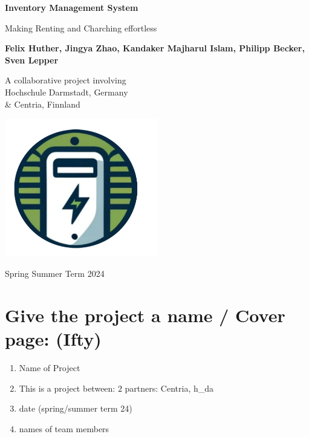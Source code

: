 \begin{titlepage}
    \begin{center}
        \vspace*{1cm}
            
        \Huge
        \textbf{Inventory Management System}
            
        \vspace{0.5cm}
        \LARGE
        Making Renting and Charching effortless
            
        \vspace{1.5cm}
            
        \textbf{
        Felix Huther,
        Jingya Zhao,
        Kandaker Majharul Islam,
        Philipp Becker,
        Sven Lepper }
          
        \vfill            
        A collaborative project involving\\
        Hochschule Darmstadt, Germany \\\& Centria, Finnland

        \vspace{0.8cm}
            
        \includegraphics[width=0.5\textwidth]{images/logo.png}

            
        \Large
      
        Spring Summer Term 2024
            
    \end{center}
\end{titlepage}

\section{Give the project a name / Cover page: (Ifty)}
\begin{enumerate}
    \item Name of Project
    \item This is a project between: \(2\) partners: Centria, h\_da
    \item date (spring/summer term 24)
    \item names of team members
    
    
\end{enumerate}
